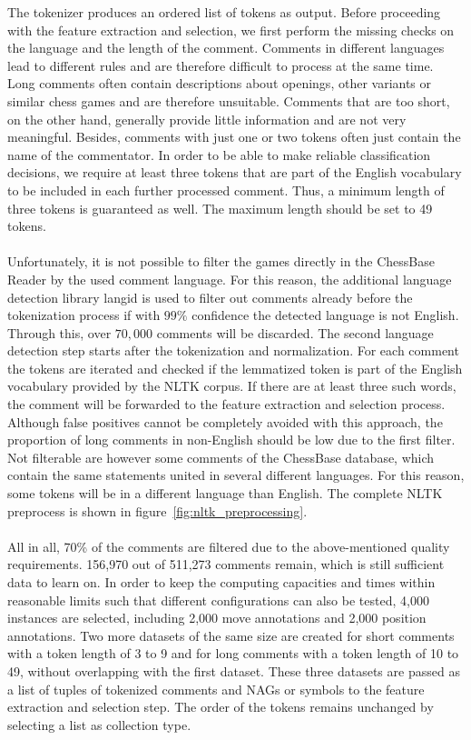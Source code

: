 \documentclass[article,type=msc,colorback,accentcolor=tud7b]{tudthesis}
\begin{document}
    The tokenizer produces an ordered list of tokens as output. Before proceeding with the feature extraction and selection, we first perform the missing checks on the language and the length of the comment. Comments in different languages lead to different rules and are therefore difficult to process at the same time. Long comments often contain descriptions about openings, other variants or similar chess games and are therefore unsuitable. Comments that are too short, on the other hand, generally provide little information and are not very meaningful. Besides, comments with just one or two tokens often just contain the name of the commentator. In order to be able to make reliable classification decisions, we require at least three tokens that are part of the English vocabulary to be included in each further processed comment. Thus, a minimum length of three tokens is guaranteed as well. The maximum length should be set to 49 tokens. \\\\
    Unfortunately, it is not possible to filter the games directly in the ChessBase Reader by the used comment language. For this reason, the additional language detection library langid is used to filter out comments already before the tokenization process if with $99\%$ confidence the detected language is not English. Through this, over $70,000$ comments will be discarded. The second language detection step starts after the tokenization and normalization. For each comment the tokens are iterated and checked if the lemmatized token is part of the English vocabulary provided by the NLTK corpus. If there are at least three such words, the comment will be forwarded to the feature extraction and selection process. Although false positives cannot be completely avoided with this approach, the proportion of long comments in non-English should be low due to the first filter. Not filterable are however some comments of the ChessBase database, which contain the same statements united in several different languages. For this reason, some tokens will be in a different language than English. The complete NLTK preprocess is shown in figure~\ref{fig:nltk_preprocessing}. \\\\
    All in all, 70\% of the comments are filtered due to the above-mentioned quality requirements. 156,970 out of 511,273 comments remain, which is still sufficient data to learn on. In order to keep the computing capacities and times within reasonable limits such that different configurations can also be tested, 4,000 instances are selected, including 2,000 move annotations and 2,000 position annotations. Two more datasets of the same size are created for short comments with a token length of 3 to 9 and for long comments with a token length of 10 to 49, without overlapping with the first dataset. These three datasets are passed as a list of tuples of tokenized comments and NAGs or symbols to the feature extraction and selection step. The order of the tokens remains unchanged by selecting a list as collection type. \\\\
\end{document}
